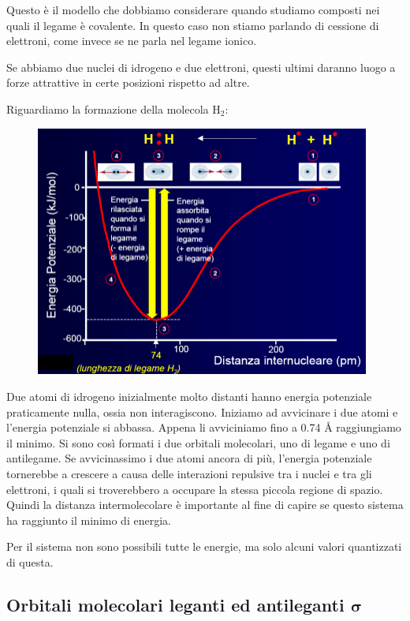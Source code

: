Questo è il modello che dobbiamo considerare quando studiamo composti nei quali il legame è covalente. In questo caso non stiamo parlando di cessione di elettroni, come invece se ne parla nel legame ionico.

Se abbiamo due nuclei di idrogeno e due elettroni, questi ultimi daranno luogo a forze attrattive in certe posizioni rispetto ad altre.

\vspace{0.2cm}Riguardiamo la formazione della molecola H$_2$:

\begin{figure}[H]
    \centering
    \includegraphics[width=11cm]{immagini/legame_covalente_H_2.png}
\end{figure}

Due atomi di idrogeno inizialmente molto distanti hanno energia potenziale praticamente nulla, ossia non interagiscono. Iniziamo ad avvicinare i due atomi e l'energia potenziale si abbassa. Appena li avviciniamo fino a 0.74 Å raggiungiamo il minimo. Si sono così formati i due orbitali molecolari, uno di legame e uno di antilegame. Se avvicinassimo i due atomi ancora di più, l'energia potenziale tornerebbe a crescere a causa delle interazioni repulsive tra i nuclei e tra gli elettroni, i quali si troverebbero a occupare la stessa piccola regione di spazio. Quindi la distanza intermolecolare è importante al fine di capire se questo sistema ha raggiunto il minimo di energia.

Per il sistema non sono possibili tutte le energie, ma solo alcuni valori quantizzati di questa.
\subsection{Orbitali molecolari leganti ed antileganti $\boldsymbol{\sigma}$}

